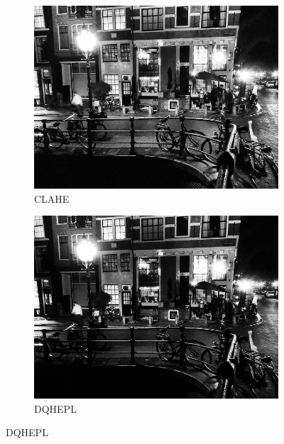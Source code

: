 \documentclass[sigchi]{acmart}
\begin{document}
\begin{figure}[htbp]
	\begin{subfigure}[b]{0.28\textwidth}
		\centering
		\includegraphics[width=\linewidth]{./procesadas/2015_00027/2015_00027_clahe.png}
		\caption{CLAHE}
	\end{subfigure}
	\hfill
	\begin{subfigure}[b]{0.28\textwidth}
		\centering
		\includegraphics[width=\linewidth]{./procesadas/2015_00027/2015_00027_dqhepl.png}
		\caption{DQHEPL}
	\end{subfigure}


\end{figure}
\end{document}
